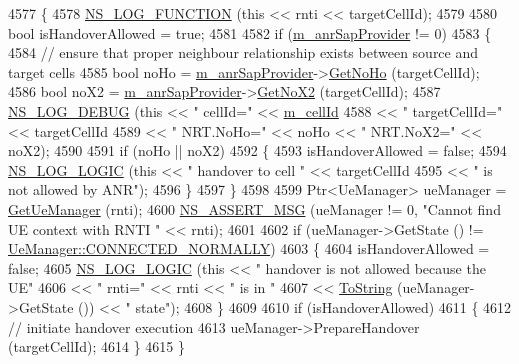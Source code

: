 \begin{DoxyCode}
4577 \{
4578   \hyperlink{log-macros-disabled_8h_a90b90d5bad1f39cb1b64923ea94c0761}{NS\_LOG\_FUNCTION} (\textcolor{keyword}{this} << rnti << targetCellId);
4579 
4580   \textcolor{keywordtype}{bool} isHandoverAllowed = \textcolor{keyword}{true};
4581 
4582   \textcolor{keywordflow}{if} (\hyperlink{classns3_1_1LteEnbRrc_a8a50cc3ec7f8a766729695ad3f0d6e9c}{m\_anrSapProvider} != 0)
4583     \{
4584       \textcolor{comment}{// ensure that proper neighbour relationship exists between source and target cells}
4585       \textcolor{keywordtype}{bool} noHo = \hyperlink{classns3_1_1LteEnbRrc_a8a50cc3ec7f8a766729695ad3f0d6e9c}{m\_anrSapProvider}->\hyperlink{classns3_1_1LteAnrSapProvider_a825c724cb173ca628ad1fc42f6b86e9f}{GetNoHo} (targetCellId);
4586       \textcolor{keywordtype}{bool} noX2 = \hyperlink{classns3_1_1LteEnbRrc_a8a50cc3ec7f8a766729695ad3f0d6e9c}{m\_anrSapProvider}->\hyperlink{classns3_1_1LteAnrSapProvider_a7781c81a1d796484f58a23f4ea44ebd6}{GetNoX2} (targetCellId);
4587       \hyperlink{group__logging_ga413f1886406d49f59a6a0a89b77b4d0a}{NS\_LOG\_DEBUG} (\textcolor{keyword}{this} << \textcolor{stringliteral}{" cellId="} << \hyperlink{classns3_1_1LteEnbRrc_a4ced331e168e6c1aeca0bb11be19b8c7}{m\_cellId}
4588                          << \textcolor{stringliteral}{" targetCellId="} << targetCellId
4589                          << \textcolor{stringliteral}{" NRT.NoHo="} << noHo << \textcolor{stringliteral}{" NRT.NoX2="} << noX2);
4590 
4591       \textcolor{keywordflow}{if} (noHo || noX2)
4592         \{
4593           isHandoverAllowed = \textcolor{keyword}{false};
4594           \hyperlink{group__logging_ga88acd260151caf2db9c0fc84997f45ce}{NS\_LOG\_LOGIC} (\textcolor{keyword}{this} << \textcolor{stringliteral}{" handover to cell "} << targetCellId
4595                              << \textcolor{stringliteral}{" is not allowed by ANR"});
4596         \}
4597     \}
4598 
4599   Ptr<UeManager> ueManager = \hyperlink{classns3_1_1LteEnbRrc_a875653948b565dc50b33f6a0434e32d9}{GetUeManager} (rnti);
4600   \hyperlink{assert_8h_aff5ece9066c74e681e74999856f08539}{NS\_ASSERT\_MSG} (ueManager != 0, \textcolor{stringliteral}{"Cannot find UE context with RNTI "} << rnti);
4601 
4602   \textcolor{keywordflow}{if} (ueManager->GetState () != \hyperlink{classns3_1_1UeManager_a2f4085fdd18d7125c27da44a5b8b6808a2a1020dce30f19aa9354ba34b2e7c5e0}{UeManager::CONNECTED\_NORMALLY})
4603     \{
4604       isHandoverAllowed = \textcolor{keyword}{false};
4605       \hyperlink{group__logging_ga88acd260151caf2db9c0fc84997f45ce}{NS\_LOG\_LOGIC} (\textcolor{keyword}{this} << \textcolor{stringliteral}{" handover is not allowed because the UE"}
4606                          << \textcolor{stringliteral}{" rnti="} << rnti << \textcolor{stringliteral}{" is in "}
4607                          << \hyperlink{namespacens3_a3d1f7e1bec1972e2ae8d64673fcfcd9c}{ToString} (ueManager->GetState ()) << \textcolor{stringliteral}{" state"});
4608     \}
4609 
4610   \textcolor{keywordflow}{if} (isHandoverAllowed)
4611     \{
4612       \textcolor{comment}{// initiate handover execution}
4613       ueManager->PrepareHandover (targetCellId);
4614     \}
4615 \}
\end{DoxyCode}


